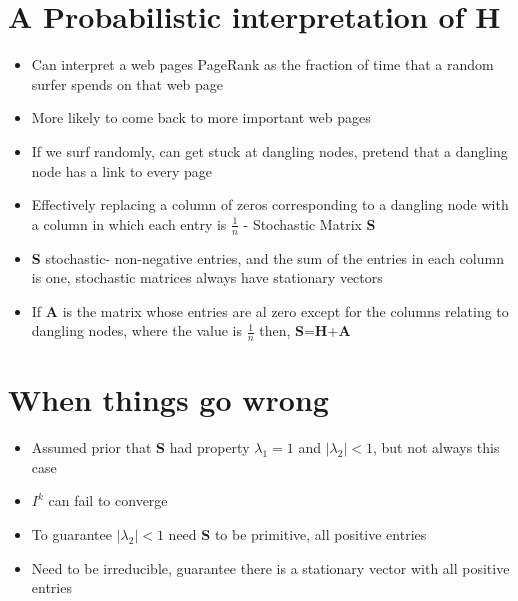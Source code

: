 \documentclass[11pt]{report}
\begin{document}
\section{A Probabilistic interpretation of H}
\begin{itemize}
\item Can interpret a web pages PageRank as the fraction of time that a random surfer spends on that web page
\item More likely to come back to more important web pages
\item If we surf randomly, can get stuck at dangling nodes, pretend that a dangling node has a link to every page 
\item Effectively replacing a column of zeros corresponding to a dangling node with a column in which each entry is $\frac{1}{n}$ - Stochastic Matrix \textbf{S}
\item \textbf{S} stochastic- non-negative entries, and the sum of the entries in each column is one, stochastic matrices always have stationary vectors
\item If \textbf{A} is the matrix whose entries are al zero except for the columns relating to dangling nodes, where the value is $\frac{1}{n}$ then, \textbf{S}=\textbf{H}+\textbf{A}
\end{itemize}
\section{When things go wrong}
\begin{itemize}
\item Assumed prior that \textbf{S} had property $\lambda_1 = 1$ and $\vert\lambda_2\vert<1$, but not always this case
\item $I^k$ can fail to converge
\item To guarantee $\vert\lambda_2\vert<1$ need \textbf{S} to be primitive, all positive entries
\item Need to be irreducible, guarantee there is a stationary vector with all positive entries
\end{itemize}
\end{document}
